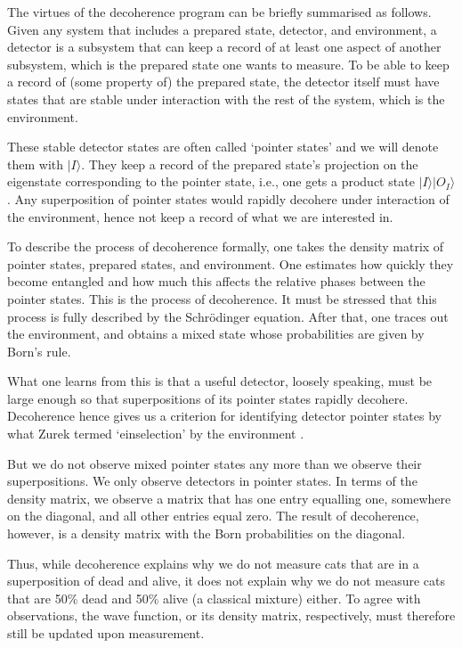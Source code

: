 \documentclass[superscriptaddress,floatfix,nofootinbib,12pt]{revtex4-2}
\begin{document}
The virtues of the decoherence program can be briefly summarised as follows. Given any system that includes a prepared state, detector, and environment, a detector is a subsystem that can keep a record of at least one aspect of another subsystem, which is the prepared state one wants to measure. To be able to keep a record of (some property of) the prepared state, the detector itself must have states that are stable under interaction with the rest of the system, which is the environment. 

These stable detector states are often called `pointer states' and we will denote them with $|I\rangle$. They keep a record of the prepared state's projection on the eigenstate corresponding to the pointer state, i.e., one gets a product state $|I\rangle |O_I\rangle$. Any superposition of pointer states would rapidly decohere under interaction of the environment, hence not keep a record of what we are interested in.

To describe the process of decoherence formally, one takes the density matrix of pointer states, prepared states, and environment. One estimates how quickly they become entangled and how much this affects the relative phases between the pointer states. This is the process of decoherence. It must be stressed that this process is fully described by the Schr\"odinger equation. After that, one traces out the environment, and obtains a mixed state whose probabilities are given by Born's rule. 

What one learns from this is that a useful detector, loosely speaking, must be large enough so that superpositions of its pointer states rapidly decohere. Decoherence hence gives us a criterion for identifying detector pointer states by what Zurek termed `einselection' by the environment \cite{zurek2003decoherence}.

But we do not observe mixed pointer states any more than we observe their superpositions. We only observe detectors in pointer states. In terms of the density matrix, we observe a matrix that has one entry equalling one, somewhere on the diagonal, and all other entries equal zero. The result of decoherence, however, is a density matrix with the Born probabilities on the diagonal.

Thus, while decoherence explains why we do not measure cats that are in a superposition of dead and alive, it does not explain why we do not measure cats that are 50\% dead and 50\% alive (a classical mixture) either. 
To agree with observations, the wave function, or its density matrix, respectively, must therefore still be updated upon measurement. 
\end{document}

